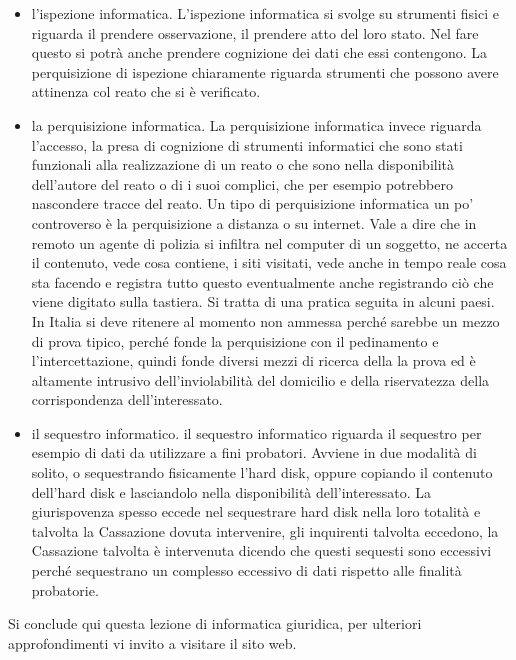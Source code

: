 \begin{itemize}
    \item l'ispezione informatica. L'ispezione informatica si svolge su strumenti fisici e riguarda il prendere osservazione, il prendere atto del loro stato. Nel fare questo si potrà anche prendere cognizione dei dati che essi contengono. La perquisizione di ispezione chiaramente riguarda strumenti che possono avere attinenza col reato che si è verificato.
    \item la perquisizione informatica. La perquisizione informatica invece riguarda l'accesso, la presa di cognizione di strumenti informatici che sono stati funzionali alla realizzazione di un reato o che sono nella disponibilità dell'autore del reato o di i suoi complici, che per esempio potrebbero nascondere tracce del reato. Un tipo di perquisizione informatica un po' controverso è la perquisizione a distanza o su internet. Vale a dire che in remoto un agente di polizia si infiltra nel computer di un soggetto, ne accerta il contenuto, vede cosa contiene, i siti visitati, vede anche in tempo reale cosa sta facendo e registra tutto questo eventualmente anche registrando ciò che viene digitato sulla tastiera. Si tratta di una pratica seguita in alcuni paesi. In Italia si deve ritenere al momento non ammessa perché sarebbe un mezzo di prova tipico, perché fonde la perquisizione con il pedinamento e l'intercettazione, quindi fonde diversi mezzi di ricerca della la prova ed è altamente intrusivo dell'inviolabilità del domicilio e della riservatezza della corrispondenza dell'interessato.
    \item il sequestro informatico. il sequestro informatico riguarda il sequestro per esempio di dati da utilizzare a fini probatori. Avviene in due modalità di solito, o sequestrando fisicamente l'hard disk, oppure copiando il contenuto dell'hard disk e lasciandolo nella disponibilità dell'interessato. La giurispovenza spesso eccede nel sequestrare hard disk nella loro totalità e talvolta la Cassazione dovuta intervenire, gli inquirenti talvolta eccedono, la Cassazione talvolta è intervenuta dicendo che questi sequesti sono eccessivi perché sequestrano un complesso eccessivo di dati rispetto alle finalità probatorie.
\end{itemize}

Si conclude qui questa lezione di informatica giuridica, per ulteriori approfondimenti vi invito a visitare il sito web.
